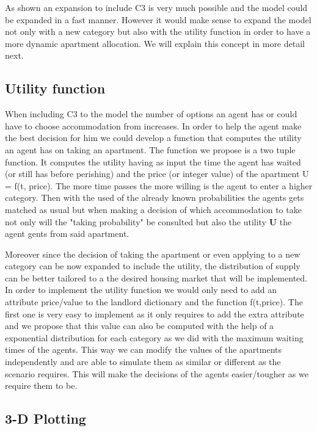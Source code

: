 As shown an expansion to include C3 is very much possible and the model could be expanded in a fast manner. However it would make sense to expand the model not only with a new category but also with the utility function in order to have a more dynamic apartment allocation. We will explain this concept in more detail next.

\subsection{Utility function}

When including C3 to the model the number of options an agent has or could have to choose accommodation from increases. In order to help the agent make the best decision for him we could develop a function that computes the utility an agent has on taking an apartment. The function we propose is a two tuple function. It computes the utility having as input the time the agent has waited (or still has before perishing) and the price (or integer value) of the apartment U = f(t, price). The more time passes the more willing is the agent to enter a higher category. Then with the used of the already known probabilities the agents gets matched as usual but when making a decision of which accommodation to take not only will the "taking probability" be consulted but also the utility \textbf{U} the agent gents from said apartment.

Moreover since the decision of taking the apartment or even applying to a new category can be now expanded to include the utility, the distribution of supply can be better tailored to a the desired housing market that will be implemented. In order to implement the utility function we would only need to add an attribute price/value to the landlord dictionary and the function f(t,price). The first one is very easy to implement as it only requires to add the extra attribute and we propose that this value can also be computed with the help of a exponential distribution for each category as we did with the maximum waiting times of the agents. This way we can modify the values of the apartments independently and are able to simulate them as similar or different as the scenario requires. This will make the decisions of the agents easier/tougher as we require them to be.

\subsection{3-D Plotting}

